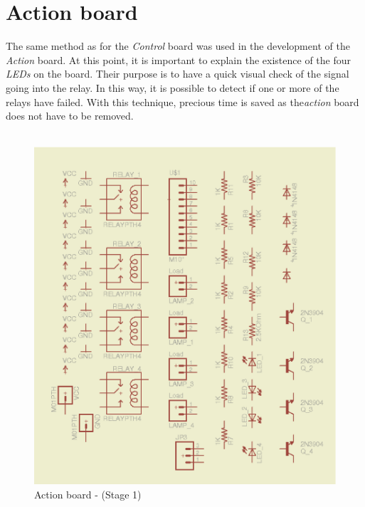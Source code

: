 \documentclass[12pt,a4paper]{report}
\begin{document}
\section{Action board}
The same method as for the \textit{Control} board was used in the development of the \textit{Action} board.
At this point, it is important to explain the existence of the four \textit{LEDs} on the board.
Their purpose is to have a quick visual check of the signal going into the relay.
In this way, it is possible to detect if one or more of the relays have failed.
With this technique, precious time is saved as the\textit{action} board does not have to be removed. \\ %
\ \\
\begin{figure}[H]
\centering
\includegraphics*[scale=0.25]{action_brd_s1}
\caption{Action board -  (Stage 1)}
\label{Action-brd-s1}
\end{figure}
\ \\
\end{document}
